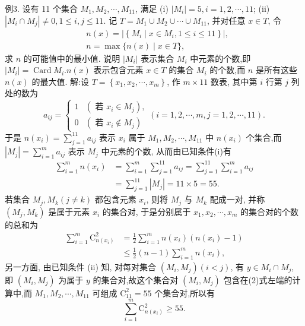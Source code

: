 例3. 设有 11 个集合 $M_1, M_2, \cdots, M_{11}$, 满足
(i) $\left|M_i\right|=5, i=1,2, \cdots, 11$;
(ii) $\left|M_i \cap M_j\right| \neq 0,1 \leqslant i, j \leqslant 11$.
记 $T=M_1 \cup M_2 \cup \cdots \cup M_{11}$, 并对任意 $x \in T$, 令
$$
\begin{aligned}
& n(x)=\left|\left\{M_i \mid x \in M_i, 1 \leqslant i \leqslant 11\right\}\right|, \\
& n=\max \{n(x) \mid x \in T\},
\end{aligned}
$$
求 $n$ 的可能值中的最小值.
说明 $\left|M_i\right|$ 表示集合 $M_i$ 中元素的个数,即 $\left|M_i\right|=\operatorname{Card} M_i . n(x)$ 表示包含元素 $x \in T$ 的集合 $M_i$ 的个数,而 $n$ 是所有这些 $n(x)$ 的最大值.
解:设 $T=\left\{x_1, x_2, \cdots, x_m\right\}$, 作 $m \times 11$ 数表, 其中第 $i$ 行第 $j$ 列处的数为
$$
a_{i j}=\left\{\begin{array}{ll}
1 & \left(\text { 若 } x_i \in M_j\right), \\
0 & \left(\text { 若 } x_i \notin M_j\right)
\end{array}(i=1,2, \cdots, m, j=1,2, \cdots, 11) .\right.
$$
于是 $n\left(x_i\right)=\sum_{j=1}^{11} a_{i j}$ 表示 $x_i$ 属于 $M_1, M_2, \cdots, M_{11}$ 中 $n\left(x_i\right)$ 个集合,而 $\left|M_j\right|=\sum_{i=1}^m a_{i j}$ 表示 $M_j$ 中元素的个数, 从而由已知条件(i)有
$$
\begin{aligned}
\sum_{i=1}^m n\left(x_i\right) & =\sum_{i=1}^m \sum_{j=1}^{11} a_{i j}=\sum_{j=1}^{11} \sum_{i=1}^m a_{i j} \\
& =\sum_{j=1}^{11}\left|M_j\right|=11 \times 5=55 . \label{eq1}
\end{aligned}
$$
若集合 $M_j, M_k(j \neq k)$ 都包含元素 $x_i$, 则将 $M_j$ 与 $M_k$ 配成一对, 并称 $\left(M_j, M_k\right)$ 是属于元素 $x_i$ 的集合对, 于是分别属于 $x_1, x_2, \cdots, x_m$ 的集合对的个数的总和为
$$
\begin{aligned}
\sum_{i=1}^m \mathrm{C}_{n\left(x_i\right)}^2 & =\frac{1}{2} \sum_{i=1}^m n\left(x_i\right)\left(n\left(x_i\right)-1\right) \\
& \leqslant \frac{1}{2}(n-1) \sum_{i=1}^m n\left(x_i\right), \label{eq2}
\end{aligned}
$$
另一方面, 由已知条件 (ii) 知, 对每对集合 $\left(M_i, M_j\right)(i<j)$, 有 $y \in M_i \cap M_j$, 即 $\left(M_i, M_j\right)$ 为属于 $y$ 的集合对,故这个集合对 $\left(M_i, M_j\right)$ 包含在(2)式左端的计算中,而 $M_1, M_2, \cdots, M_{11}$ 可组成 $\mathrm{C}_{11}^2=55$ 个集合对,所以有
$$
\sum_{i=1}^m \mathrm{C}_{n\left(x_i\right)}^2 \geqslant 55. \label{eq3}
$$
